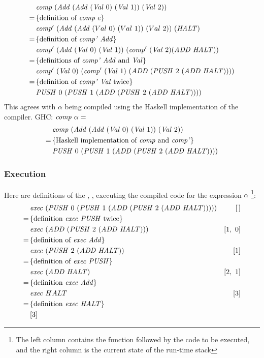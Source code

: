 \documentclass {article}
\begin{document}
\begin{align*}
&\Comp (\Add (\Add (\Val 0)\ (\Val 1))\ (\Val 2)) \\
=\, & \{ \mbox{definition of \comp\ $e$} \} \\
&\Compp  (\Add (\Add  (Val\ 0)\
			(Val\ 1))\ (Val\ 2))\ 			(\HALT) \\
=\, & \{ \mbox{definition of \compp\ \add} \} \\
&\Compp  (\Add (\Val 0)\ (\Val 1))\ (\Compp  (\Val 2) 	  (\ADD  \HALT)) \\
=\, & \{ \mbox{definitions of \compp\
		 \add\ and \val} \} \\
&\Compp  (\Val 0)\ (\Compp  (\Val 1)\
				(\ADD  (\PUSH 2\ (\ADD  \HALT)))) \\
=\, & \{ \mbox{definition of \compp\ \val\ twice} \} \\
&					 \PUSH 0\ (\PUSH 1\ (\ADD  (\PUSH 2\ (\ADD  \HALT)))) \\
\end{align*}
This agrees with $\alpha$ being compiled
using the Haskell implementation of the compiler.
GHC: \( \mathit{comp\ } \alpha =\)
\begin{align*}
&\mathit{comp\ } (\mathit{Add\ } (\mathit{Add\ } (\mathit{Val\ } 0)\ (\mathit{Val\ } 1))\ (\mathit{Val\ } 2)) \\
=\, & \{ \mbox{Haskell implementation of \textit{comp}\ and \textit{comp'}} \} \\
&\mathit{PUSH\ } 0\ (\mathit{PUSH\ } 1\ (\mathit{ADD\ }  (\mathit{PUSH\ } 2\ (\mathit{ADD\ } \mathit{HALT})))) 
\end{align*}

\subsubsection{Execution}

Here are definitions of the \vm, \exec, 
executing the compiled code for the expression $\alpha$
\footnote{ The left column contains the function followed
by the code to be executed,
and the right column is the current state of the run-time stack}:
\begin{align*}
&\Exec (\PUSH 0\ (\PUSH 1\ (\ADD  (\PUSH 2\ (\ADD \HALT))))) &[\, ] \\
=\, & \{ \mbox{definition \exec\ \PUSHt\ twice} \} \\
&\Exec (\ADD  (\PUSH 2\ (\ADD \HALT))) 					&[1,\ 0] \\
=\, & \{ \mbox{definition of \exec\ \add} \} \\
&\Exec (\PUSH 2\ (\ADD \HALT)) 								&[1] \\
=\, & \{ \mbox{definition  of \exec\ \PUSHt} \} \\
&\Exec (\ADD \HALT)										 &[2,\ 1] \\
=\, & \{ \mbox{definition \exec\ \add} \} \\
&\Exec HALT 												&[3] \\
=\, & \{ \mbox{definition \exec\ \HALTt} \} \\
&[3]
\end{align*}
\end{document}
